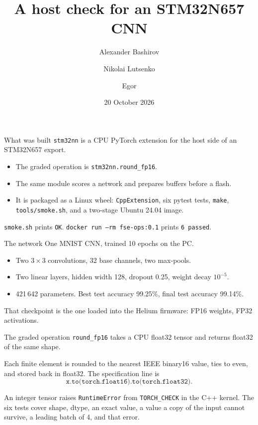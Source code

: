\documentclass[aspectratio=169,11pt]{beamer}
\title{A host check for an STM32N657 CNN}
\author{Alexander Bashirov \and Nikolai Lutsenko \and Egor}
\date{20 October 2026}
\begin{document}
\begin{frame}
  \titlepage
\end{frame}

\begin{frame}{What was built}
  \texttt{stm32nn} is a CPU PyTorch extension for the host side of an STM32N657 export.

  \begin{itemize}
    \item The graded operation is \texttt{stm32nn.round\_fp16}.
    \item The same module scores a network and prepares buffers before a flash.
    \item It is packaged as a Linux wheel: \texttt{CppExtension}, six pytest tests, \texttt{make}, \texttt{tools/smoke.sh}, and a two-stage Ubuntu 24.04 image.
  \end{itemize}

  \texttt{smoke.sh} prints \texttt{OK}. \texttt{docker run --rm fse-ops:0.1} prints \texttt{6 passed}.
\end{frame}

\begin{frame}{The network}
  One MNIST CNN, trained 10 epochs on the PC.

  \begin{itemize}
    \item Two \(3\times 3\) convolutions, 32 base channels, two max-pools.
    \item Two linear layers, hidden width 128, dropout 0.25, weight decay \(10^{-5}\).
    \item 421\,642 parameters. Best test accuracy 99.25\%, final test accuracy 99.14\%.
  \end{itemize}

  That checkpoint is the one loaded into the Helium firmware: FP16 weights, FP32 activations.
\end{frame}

\begin{frame}{The graded operation}
  \texttt{round\_fp16} takes a CPU float32 tensor and returns float32 of the same shape.

  Each finite element is rounded to the nearest IEEE binary16 value, ties to even, and stored back in float32. The specification line is
  \[
    \texttt{x.to(torch.float16).to(torch.float32)}.
  \]

  An integer tensor raises \texttt{RuntimeError} from \texttt{TORCH\_CHECK} in the C++ kernel. The six tests cover shape, dtype, an exact value, a value a copy of the input cannot survive, a leading batch of 4, and that error.
\end{frame}
\end{document}
